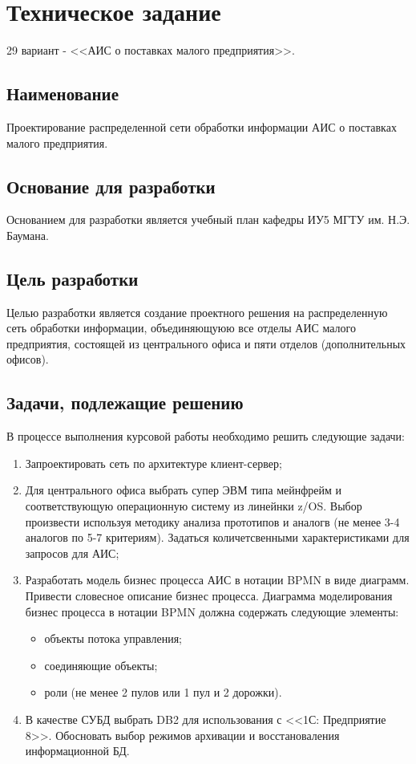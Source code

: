 \documentclass[russian,utf8,emptystyle]{eskdtext}
\begin{document}
\maketitle
%

\tableofcontents
\clearpage

\section{Техническое задание}

29 вариант - <<АИС о поставках малого предприятия>>.

\subsection{Наименование}
Проектирование распределенной сети обработки информации АИС о поставках малого предприятия.

\subsection{Основание для разработки}
Основанием для разработки является учебный план кафедры ИУ5 МГТУ им. Н.Э. Баумана.

\subsection{Цель разработки}
Целью разработки является создание проектного решения на распределенную сеть обработки информации, объединяющуюю все отделы АИС малого предприятия, состоящей из центрального офиса и пяти отделов (дополнительных офисов).

\subsection{Задачи, подлежащие решению}
В процессе выполнения курсовой работы необходимо решить следующие задачи:
\begin{enumerate}[label=\arabic*)]
\item Запроектировать сеть по архитектуре клиент-сервер;
\item Для центрального офиса выбрать супер ЭВМ типа мейнфрейм и соответствующую операционную систему из линейнки z/OS. Выбор произвести используя методику анализа прототипов и аналогв (не менее 3-4 аналогов по 5-7 критериям). Задаться количетсвенными характеристиками для запросов для АИС;
\item Разработать модель бизнес процесса АИС в нотации BPMN в виде диаграмм. Привести словесное описание бизнес процесса. Диаграмма моделирования бизнес процесса в нотации BPMN должна содержать следующие элементы:
\begin{itemize}[label=-]
\item объекты потока управления;
\item соединяющие объекты;
\item роли (не менее 2 пулов или 1 пул и 2 дорожки).
\end{itemize}
\item В качестве СУБД выбрать DB2 для использования с <<1С: Предприятие 8>>. Обосновать выбор режимов архивации и восстановаления информационной БД.
\end{enumerate}
\end{document}
